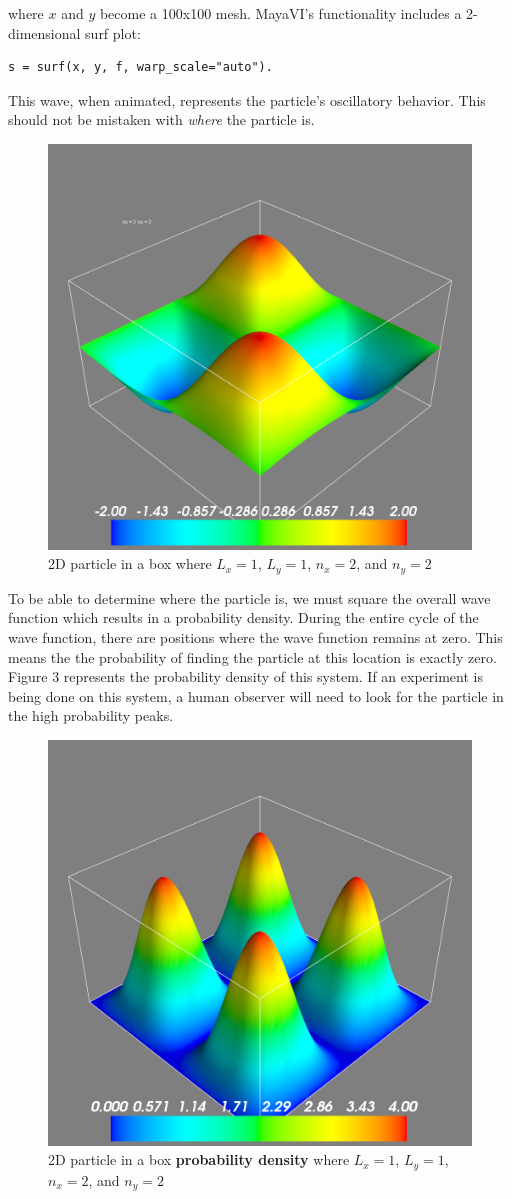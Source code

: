 \documentclass[11pt]{article}
\begin{document}
\noindent where $x$ and $y$ become a 100x100 mesh. MayaVI's functionality includes a 2-dimensional surf plot:

\begin{verbatim}
s = surf(x, y, f, warp_scale="auto").
\end{verbatim}

This wave, when animated, represents the particle's oscillatory behavior. This should not be mistaken with \textit{where} the particle is.

\begin{figure}[h]
	\centering
	\includegraphics[width = .5\textwidth]{2d22}
	\caption{2D particle in a box where $L_x = 1$, $L_y = 1$, $n_x = 2$, and $n_y = 2$}
\end{figure}

To be able to determine where the particle is, we must square the overall wave function which results in a probability density. During the entire cycle of the wave function, there are positions where the wave function remains at zero. This means the the probability of finding the particle at this location is exactly zero. Figure 3 represents the probability density of this system. If an experiment is being done on this system, a human observer will need to look for the particle in the high probability peaks. 

\begin{figure}[h]
	\centering
	\caption{2D particle in a box \textbf{probability density} where $L_x = 1$, $L_y = 1$, $n_x = 2$, and $n_y = 2$}
	\includegraphics[width = .5\textwidth]{2d22squared}
\end{figure}
\end{document}

